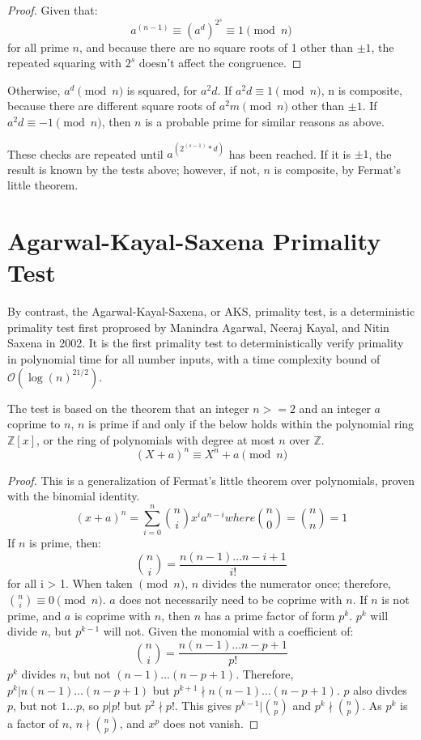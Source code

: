\documentclass{article}
\begin{document}
\begin{proof}
    Given that:
    \[
        a^{(n - 1)} \equiv (a^d)^{2^s} \equiv 1 \pmod{n}
    \]
    for all prime $n$, and because there are no square roots of 1 other than $\pm 1$, the repeated squaring with $2^s$ doesn't affect the congruence.
\end{proof}

Otherwise, $a^d \pmod{n}$ is squared, for $a^2d$. If $a^2d \equiv 1 \pmod{n}$, n is composite, because there are different square roots of $a^2m \pmod{n}$ other than $\pm 1$. If $a^2d \equiv -1 \pmod{n}$, then $n$ is a probable prime for similar reasons as above.

These checks are repeated until $a^{(2^{(s - 1)} * d)}$ has been reached. If it is $\pm 1$, the result is known by the tests above; however, if not, $n$ is composite, by Fermat's little theorem.

\section{Agarwal-Kayal-Saxena Primality Test} %
By contrast, the Agarwal-Kayal-Saxena, or AKS, primality test, is a deterministic primality test first proprosed by Manindra Agarwal, Neeraj Kayal, and Nitin Saxena in 2002. It is the first primality test to deterministically verify primality in polynomial time for all number inputs, with a time complexity bound of $\mathcal{O}(\log{(n)}^{21/2})$.

The test is based on the theorem that an integer $n >= 2$ and an integer $a$ coprime to $n$, $n$ is prime if and only if the below holds within the polynomial ring $\mathbb{Z}[x]$, or the ring of polynomials with degree at most $n$ over $\mathbb{Z}$.
\[
    (X + a)^n \equiv X^n + a \pmod{n}
\]

\begin{proof} %
    This is a generalization of Fermat's little theorem over polynomials, proven with the binomial identity.
    \[
        (x + a)^n = \sum_{i=0}^{n} \binom{n}{i} x^i a^{n - i} where \binom{n}{0} = \binom{n}{n} = 1
    \]
    If $n$ is prime, then:
    \[
        \binom{n}{i} = \frac{n (n - 1) \ldots{} {n - i + 1}}{i!}
    \]
    for all i > 1. When taken $\pmod{n}$, $n$ divides the numerator once; therefore, $\binom{n}{i} \equiv 0 \pmod{n}$. $a$ does not necessarily need to be coprime with $n$.
    If $n$ is not prime, and $a$ is coprime with $n$, then $n$ has a prime factor of form $p^k$. $p^k$ will divide $n$, but $p^{k - 1}$ will not. Given the monomial with a coefficient of:
    \[
        \binom{n}{i} = \frac{n (n - 1) \ldots{} {n - p + 1}}{p!}
    \]
    $p^k$ divides $n$, but not $(n - 1) \ldots{} (n - p + 1)$. Therefore, $p^k \vert n (n - 1) \ldots{} (n - p + 1)$ but $p^{k + 1} \nmid n (n - 1) \ldots{} (n - p + 1)$. $p$ also divdes $p$, but not $1 \ldots p$, so $p \vert p!$ but $p^2 \nmid p!$. This gives $p^{k - 1} \vert \binom{n}{p}$ and $p^k \nmid \binom{n}{p}$. As $p^k$ is a factor of $n$, $n \nmid \binom{n}{p}$, and $x^p$ does not vanish.
\end{proof}
\end{document}
